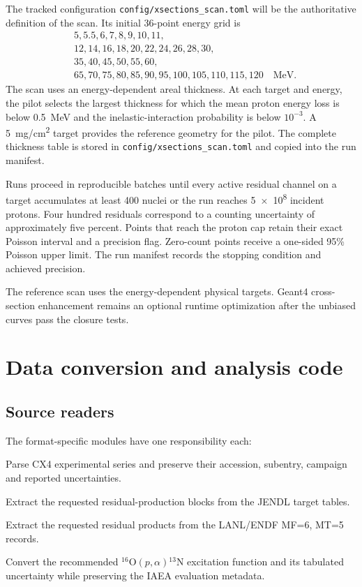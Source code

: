 \documentclass[11pt]{article}
\newcommand{\file}[1]{\texttt{#1}}
\newcommand{\Ox}[1]{{}^{#1}\mathrm{O}}
\newcommand{\Ni}[1]{{}^{#1}\mathrm{N}}
\begin{document}
The tracked configuration \file{config/xsections\_scan.toml} will be the
authoritative definition of the scan.  Its initial 36-point energy grid is
\begin{align*}
  &5, 5.5, 6, 7, 8, 9, 10, 11,\\
  &12, 14, 16, 18, 20, 22, 24, 26, 28, 30,\\
  &35, 40, 45, 50, 55, 60,\\
  &65, 70, 75, 80, 85, 90, 95, 100, 105, 110, 115, 120
  \quad\text{MeV}.
\end{align*}
The scan uses an energy-dependent areal thickness.  At each target and energy,
the pilot selects the largest thickness for which the mean proton energy loss
is below \SI{0.5}{MeV} and the inelastic-interaction probability is below
$10^{-3}$.  A \SI{5}{mg/cm^2} target provides the reference geometry for the
pilot.  The complete thickness table is stored in
\file{config/xsections\_scan.toml} and copied into the run manifest.

Runs proceed in reproducible batches until every active residual channel on a
target accumulates at least 400 nuclei or the run reaches \num{5e8} incident
protons.  Four hundred residuals correspond to a counting uncertainty of
approximately five percent.  Points that reach the proton cap retain their
exact Poisson interval and a precision flag.  Zero-count points receive a
one-sided 95\% Poisson upper limit.  The run manifest records the stopping
condition and achieved precision.

The reference scan uses the energy-dependent physical targets.  Geant4
cross-section enhancement remains an optional runtime optimization
after the unbiased curves pass the closure tests.

\section{Data conversion and analysis code}

\subsection{Source readers}

The format-specific modules have one responsibility each:
\begin{description}[style=nextline,leftmargin=2.5cm]
  \item[\file{exfor.py}]
    Parse CX4 experimental series and preserve their accession, subentry,
    campaign and reported uncertainties.
  \item[\file{jendl.py}]
    Extract the requested residual-production blocks from the JENDL target
    tables.
  \item[\file{endf6.py}]
    Extract the requested residual products from the LANL/ENDF MF=6, MT=5
    records.
  \item[\file{iaea.py}]
    Convert the recommended $\Ox{16}(p,\alpha)\Ni{13}$ excitation function and
    its tabulated uncertainty while preserving the IAEA evaluation metadata.
\end{description}
\end{document}
